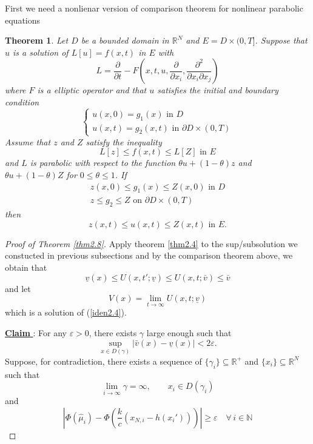 \documentclass[12pt, a4paper]{article}
\newtheorem{thm}{Theorem}[section]
\numberwithin{equation}{section}
\newcommand{\N}{\mathbb{N}}
\newcommand{\R}{\mathbb{R}}
\newcommand{\hmu}{\hat{\mu}}
\newcommand{\claim}[1]{\textnormal{\underline{\textbf{Claim #1}}: }}
\newcommand{\pd}[2]{\frac{\partial #1}{\partial #2}}
\newcommand{\pddm}[3]{\frac{\partial^2 #1}{\partial #2\partial #3}}
\begin{document}
\begin{CJK}{UTF8}{bkai}
	First we need a nonlienar version of comparison theorem for nonlinear parabolic equations
\begin{thm}\cite[Theorem 12, p187-188]{PW1967}
	Let $D$ be a bounded domain in $\R^N$ and $E=D\times(0,T]$. Suppose that $u$ is a solution of $L[u]=f(x,t)$ in $E$ with 
\[
	L=\pd{}{t}-F\left(x,t,u,\pd{}{x_i},\pddm{}{x_i}{x_j}\right)
\]
where $F$ is a elliptic operator and that $u$ satisfies the initial and boundary condition
\[
\begin{cases}
	u(x,0)=g_1(x)\mbox{ in }D\\
	u(x,t)=g_2(x,t)\mbox{ in }\partial D\times(0,T)
\end{cases}
\]
Assume that $z$ and $Z$ satisfy the inequality
\[
	L[z]\leq f(x,t)\leq L[Z]\mbox{ in }E
\]
and $L$ is parabolic with respect to the function $\theta u+(1-\theta)z$ and $\theta u+(1-\theta)Z$ for $0\leq \theta\leq 1$. If
\begin{align*}
	z(x,0)\leq g_1(x)\leq Z(x,0)\mbox{ in }D\\
	z\leq g_2\leq Z\mbox{ on }\partial D\times(0,T)
\end{align*}
then
\[
	z(x,t)\leq u(x,t)\leq Z(x,t)\mbox{ in }E.
\]
\end{thm}

\begin{proof}[Proof of Theorem \ref{thm2.8}]

	Apply theorem \ref{thm2.4} to the sup/subsolution we constucted in previous subsections and by the comparison theorem above, we obtain that
\[
	\underline{v}(x)\leq U(x,t';\underline{v})\leq U(x,t;\bar{v})\leq\bar{v}
\]
and let
\begin{equation}
	V(x)=\lim_{t\to\infty} U(x,t;\underline{v})
\end{equation}
which is a solution of (\ref{iden2.4}). 

\claim{}{For any $\varepsilon>0$, there exists $\gamma$ large enough such that
\[
	\sup_{x\in D(\gamma)}|\bar{v}(x)-\underline{v}(x)|<2\varepsilon.
\]
}
Suppose, for contradiction, there exists a sequence of $\{\gamma_i\}\subseteq\R^+$ and $\{x_i\}\subseteq\R^N$ such that
\begin{equation}
	\lim_{i\to\infty}\gamma=\infty,\quad\quad x_i\in D(\gamma_i)
\end{equation}
and
\begin{equation}\label{iden2.29}
	\left|\Phi(\hmu_i)-\Phi\left(\frac{k}{c}(x_{N,i}-h(x_i'))\right)\right|\geq \varepsilon\quad\forall\, i\in\N
\end{equation}


\end{proof}
\end{CJK}
\end{document}
